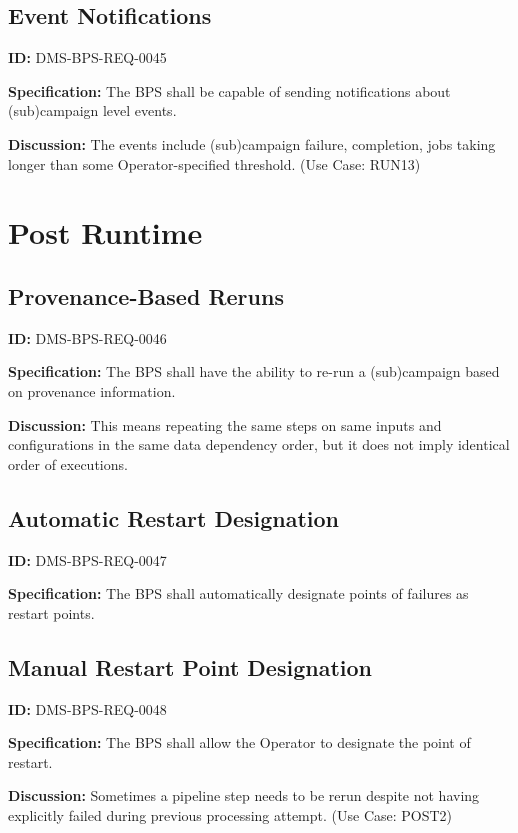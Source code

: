 \documentclass[SE,toc]{lsstdoc}
\begin{document}
\subsection{Event Notifications}

\label{DMS-BPS-REQ-0045}
\textbf{ID:} DMS-BPS-REQ-0045

\textbf{Specification:}
The BPS shall be capable of sending notifications about (sub)campaign level events.

\textbf{Discussion:}
The events include (sub)campaign failure, completion, jobs taking longer than some Operator-specified threshold.  (Use Case: RUN13)

\section{Post Runtime}

\subsection{Provenance-Based Reruns}

\label{DMS-BPS-REQ-0046}
\textbf{ID:} DMS-BPS-REQ-0046

\textbf{Specification:}
The BPS shall have the ability to re-run a (sub)campaign based on provenance information.

\textbf{Discussion:}
This means repeating the same steps on same inputs and configurations in the same data dependency order, but it does not imply identical order of executions.

\subsection{Automatic Restart Designation}

\label{DMS-BPS-REQ-0047}
\textbf{ID:} DMS-BPS-REQ-0047

\textbf{Specification:}
The BPS shall automatically designate points of failures as restart points.

\subsection{Manual Restart Point Designation}

\label{DMS-BPS-REQ-0048}
\textbf{ID:} DMS-BPS-REQ-0048

\textbf{Specification:}
The BPS shall allow the Operator to designate the point of restart.

\textbf{Discussion:}
Sometimes a pipeline step needs to be rerun despite not having explicitly failed during previous processing attempt. (Use Case: POST2)
\end{document}
